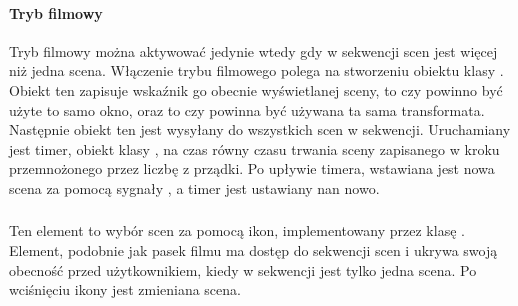 \paragraph*{Tryb filmowy}

\par
Tryb filmowy można aktywować jedynie wtedy gdy w sekwencji scen jest więcej niż jedna scena.
Włączenie trybu filmowego polega na stworzeniu obiektu klasy .
Obiekt ten zapisuje wskaźnik go obecnie wyświetlanej sceny, to czy powinno być użyte to samo okno, oraz to czy powinna być używana ta sama transformata.
Następnie obiekt ten jest wysyłany do wszystkich scen w sekwencji.
Uruchamiany jest timer, obiekt klasy , na czas równy czasu trwania sceny zapisanego w kroku przemnożonego przez liczbę z prządki.
Po upływie timera, wstawiana jest nowa scena za pomocą sygnały , a timer jest ustawiany nan nowo.

\subsubsection{}
\label{sec:sokar-framechooser}

Ten element to wybór scen za pomocą ikon, implementowany przez klasę .
Element, podobnie jak pasek filmu ma dostęp do sekwencji scen i ukrywa swoją obecność przed użytkownikiem, kiedy w sekwencji jest tylko jedna scena.
Po wciśnięciu ikony jest zmieniana scena.